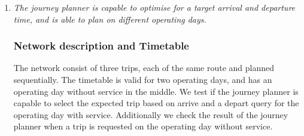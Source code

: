 \documentclass[a4paper,11pt]{article}
\begin{document}
\begin{enumerate}
\begin{enumerate}
\newpage

\item \textit{The journey planner is capable to optimise for a target arrival and departure time, and is able to plan on different operating days.}

\subsubsection*{Network description and Timetable}
The network consist of three trips, each of the same route and planned sequentially.
The timetable is valid for two operating days, and has an operating day without service in the middle.
We test if the journey planner is capable to select the expected trip based on arrive and a depart query for the operating day with service.
Additionally we check the result of the journey planner when a trip is requested on the operating day without service.

\begin{figure}[h]
\vspace{0.5em}
\raggedleft
\begin{minipage}{225pt}
\end{minipage}
\label{fig:arrival_departure_network}
\vspace{-1.5em}
\end{figure}


\end{enumerate}
\end{enumerate}
\end{document}
